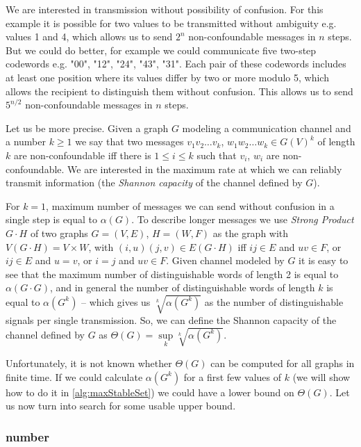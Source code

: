 We are interested in transmission without possibility of confusion. For this example it is possible for two values to be transmitted without ambiguity e.g. values 1 and 4, which allows us to send $2^n$ non-confoundable messages in $n$ steps. But we could do better, for example we could communicate five two-step codewords e.g. "00", "12", "24", "43", "31". Each pair of these codewords includes at least one position where its values differ by two or more modulo 5, which allows the recipient to distinguish them without confusion.  This allows us to send $5^{n / 2}$ non-confoundable messages in $n$ steps.

Let us be more precise. Given a graph $G$ modeling a communication channel and a number $k \geq 1$ we say that two messages $v_1v_2\ldots v_k$, $w_1w_2\ldots w_k \in G(V)^k$ of length $k$ are non-confoundable iff there is $1 \leq i \leq k$ such that $v_i$, $w_i$ are non-confoundable. We are interested in the maximum rate at which we can reliably transmit information (the \emph{Shannon capacity} of the channel defined by $G$).

For $k = 1$, maximum number of messages we can send without confusion in a single step is equal to $\alpha(G)$. To describe longer messages we use \emph{Strong Product} $G \cdot H$ of two graphs $G = (V, E)$, $H = (W, F)$ as the graph with $V(G \cdot H) = V \times W$, with $(i, u)(j, v) \in E(G \cdot H)$ iff $ij \in E$ and $uv \in F$, or $ij \in E$ and $u = v$, or $i = j$ and $uv \in F$. Given channel modeled by $G$ it is easy to see that the maximum number of distinguishable words of length 2 is equal to $\alpha(G \cdot G)$, and in general the number of distinguishable words of length $k$ is equal to $\alpha(G^k)$ -- which gives us $\sqrt[k]{\alpha(G^k)}$ as the number of distinguishable signals per single transmission. So, we can define the Shannon capacity of the channel defined by $G$ as $\Theta(G) = \sup\limits_k \sqrt[k]{\alpha(G^k)}$. 

Unfortunately, it is not known whether $\Theta(G)$ can be computed for all graphs in finite time. If we could calculate $\alpha(G^k)$ for a first few values of $k$ (we will show how to do it in \cref{alg:maxStableSet}) we could have a lower bound on $\Theta(G)$. Let us now turn into search for some usable upper bound.

\subsubsection{\Lovasz number}

